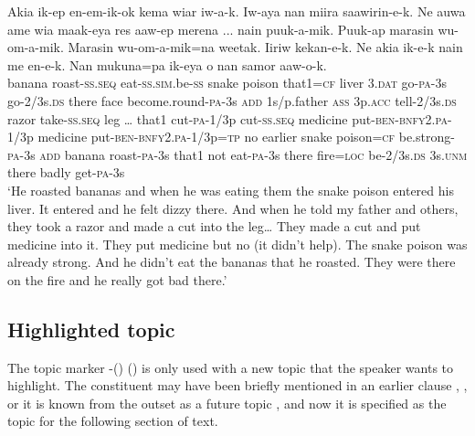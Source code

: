 \ea%
\label{ex:x1677}
\gll Akia  ik-ep  en-em-ik-ok      kema  wiar  iw-a-k. Iw-aya  nan  miira  saawirin-e-k. Ne  auwa  ame  wia  maak-eya  res  aaw-ep merena  ...  nain  puuk-a-mik.  Puuk-ap  marasin wu-om-a-mik.  Marasin  wu-om-a-mik=na weetak.  Iiriw     kekan-e-k. Ne  akia  ik-e-k  nain  me  en-e-k.  Nan mukuna=pa  ik-eya o  nan  samor  aaw-o-k.\\
banana  roast-\textsc{ss}.\textsc{seq}  eat-\textsc{ss}.\textsc{sim}.be-\textsc{ss}  snake  poison that1=\textsc{cf}  liver  3.\textsc{dat}  go-\textsc{pa}-3s go-2/3s.\textsc{ds}  there  face  become.round-\textsc{pa}-3s \textsc{add}  1s/p.father  \textsc{ass}  3p.\textsc{acc}  tell-2/3s.\textsc{ds}  razor  take-\textsc{ss}.\textsc{seq} leg  {\dots}  that1  cut-\textsc{pa}-1/3p  cut-\textsc{ss}.\textsc{seq}  medicine put-\textsc{ben}-\textsc{bnfy}2.\textsc{pa}-1/3p  medicine  put-\textsc{ben}-\textsc{bnfy}2.\textsc{pa}-1/3p=\textsc{tp} no  earlier  snake  poison=\textsc{cf}  be.strong-\textsc{pa}-3s \textsc{add}  banana  roast-\textsc{pa}-3s  that1  not  eat-\textsc{pa}-3s  there fire=\textsc{loc}  be-2/3s.\textsc{ds}  3s.\textsc{unm}  there  badly  get-\textsc{pa}-3s\\
\glt`He roasted bananas and when he was eating them the snake poison entered his liver. It entered and he felt dizzy there. And when he told my father and others, they took a razor and made a cut into the leg{\dots} They made a cut and put medicine into it. They put medicine but no (it didn't help). The snake poison was already strong. And he didn't eat the bananas that he roasted. They were there on the fire and he really got bad there.'
\z


\subsection{Highlighted topic}

The topic marker -() () is only used with a new topic that the speaker wants to highlight. The constituent may have been briefly mentioned in an earlier clause , , or it is known from the outset as a future topic , and now it is specified as the topic for the following section of text. 

